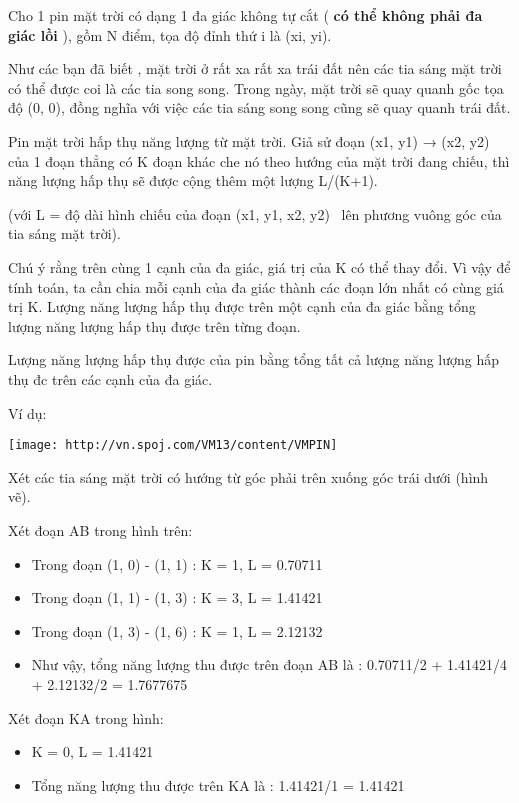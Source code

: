 



   Cho 1 pin mặt trời có dạng 1 đa giác không tự cắt (   \textbf{    có thể không phải đa giác lồi   }   ), gồm N điểm, tọa độ đỉnh thứ i là (xi, yi).  

   Như các bạn đã biết , mặt trời ở rất xa rất xa trái đất nên các tia sáng mặt trời có thể được coi là các tia song song. Trong ngày, mặt trời sẽ quay quanh gốc tọa độ (0, 0), đồng nghĩa với việc các tia sáng song song cũng sẽ quay quanh trái đất.  

   Pin mặt trời hấp thụ năng lượng từ mặt trời. Giả sử đoạn (x1, y1) → (x2, y2) của 1 đoạn thẳng có K đoạn khác che nó theo hướng của mặt trời đang chiếu, thì năng lượng hấp thụ sẽ được cộng thêm một lượng L/(K+1).  

   (với L = độ dài hình chiếu của đoạn (x1, y1, x2, y2)  lên phương vuông góc của tia sáng mặt trời).  

   Chú ý rằng trên cùng 1 cạnh của đa giác, giá trị của K có thể thay đổi. Vì vậy để tính toán, ta cần chia mỗi cạnh của đa giác thành các đoạn lớn nhất có cùng giá trị K. Lượng năng lượng hấp thụ được trên một cạnh của đa giác bằng tổng lượng năng lượng hấp thụ được trên từng đoạn.  

   Lượng năng lượng hấp thụ được của pin bằng tổng tất cả lượng năng lượng hấp thụ đc trên các cạnh của đa giác.  

   Ví dụ:  


\texttt{[image: http://vn.spoj.com/VM13/content/VMPIN]}

   Xét các tia sáng mặt trời có hướng từ góc phải trên xuống góc trái dưới (hình vẽ).  

   Xét đoạn AB trong hình trên:  
\begin{itemize}
	\item     Trong đoạn (1, 0) - (1, 1) : K = 1, L = 0.70711   
	\item     Trong đoạn (1, 1) - (1, 3) : K = 3, L = 1.41421   
	\item     Trong đoạn (1, 3) - (1, 6) : K = 1, L = 2.12132   
	\item     Như vậy, tổng năng lượng thu được trên đoạn AB là : 0.70711/2 + 1.41421/4 + 2.12132/2 = 1.7677675   
\end{itemize}

   Xét đoạn KA trong hình:  
\begin{itemize}
	\item     K = 0, L = 1.41421   
	\item     Tổng năng lượng thu được trên KA là : 1.41421/1 = 1.41421   
\end{itemize}

